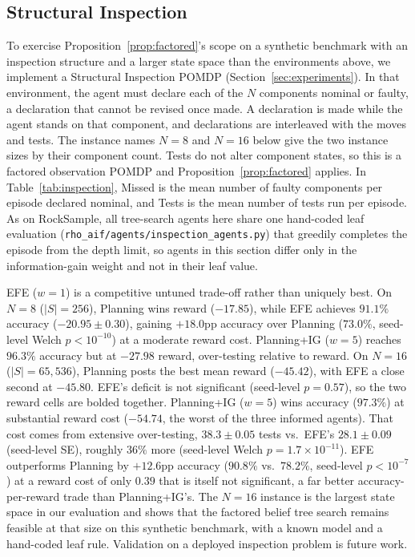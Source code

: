 \subsection{Structural Inspection}
\label{app:inspection_details}

To exercise Proposition~\ref{prop:factored}'s scope on a synthetic benchmark with an inspection structure and a larger state space than the environments above, we implement a Structural Inspection POMDP (Section~\ref{sec:experiments}). In that environment, the agent must declare each of the $N$ components nominal or faulty, a declaration that cannot be revised once made. A declaration is made while the agent stands on that component, and declarations are interleaved with the moves and tests. The instance names $N{=}8$ and $N{=}16$ below give the two instance sizes by their component count. Tests do not alter component states, so this is a factored observation POMDP and Proposition~\ref{prop:factored} applies. In Table~\ref{tab:inspection}, Missed is the mean number of faulty components per episode declared nominal, and Tests is the mean number of tests run per episode. As on RockSample, all tree-search agents here share one hand-coded leaf evaluation (\texttt{rho\_\allowbreak aif/\allowbreak agents/\allowbreak inspection\_\allowbreak agents.py}) that greedily completes the episode from the depth limit, so agents in this section differ only in the information-gain weight and not in their leaf value.



EFE ($w{=}1$) is a competitive untuned trade-off rather than uniquely best. On $N{=}8$ ($|S|{=}256$), Planning wins reward ($-17.85$), while EFE achieves $91.1\%$ accuracy ($-20.95 \pm 0.30$), gaining $+18.0$pp accuracy over Planning ($73.0\%$, seed-level Welch $p<10^{-10}$) at a moderate reward cost. Planning+IG ($w{=}5$) reaches $96.3\%$ accuracy but at $-27.98$ reward, over-testing relative to reward. On $N{=}16$ ($|S|{=}65{,}536$), Planning posts the best mean reward ($-45.42$), with EFE a close second at $-45.80$. EFE's deficit is not significant (seed-level $p{=}0.57$), so the two reward cells are bolded together. Planning+IG ($w{=}5$) wins accuracy ($97.3\%$) at substantial reward cost ($-54.74$, the worst of the three informed agents). That cost comes from extensive over-testing, $38.3 \pm 0.05$ tests vs.\ EFE's $28.1 \pm 0.09$ (seed-level SE), roughly $36\%$ more (seed-level Welch $p{=}1.7{\times}10^{-11}$). EFE outperforms Planning by $+12.6$pp accuracy ($90.8\%$ vs.\ $78.2\%$, seed-level $p<10^{-7}$) at a reward cost of only $0.39$ that is itself not significant, a far better accuracy-per-reward trade than Planning+IG's. The $N{=}16$ instance is the largest state space in our evaluation and shows that the factored belief tree search remains feasible at that size on this synthetic benchmark, with a known model and a hand-coded leaf rule. Validation on a deployed inspection problem is future work.

